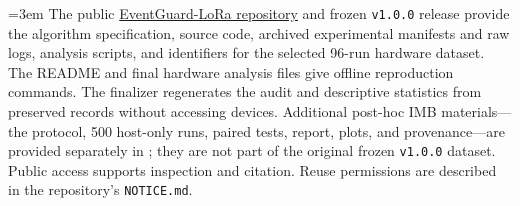 \documentclass[11pt]{article}
\begin{document}
\begingroup\emergencystretch=3em
The public \href{https://github.com/Sver0411/EventGuard-LoRa}{EventGuard-LoRa repository} and frozen \texttt{v1.0.0} release provide the algorithm specification, source code, archived experimental manifests and raw logs, analysis scripts, and identifiers for the selected 96-run hardware dataset. The README and final hardware analysis files give offline reproduction commands. The finalizer regenerates the audit and descriptive statistics from preserved records without accessing devices. Additional post-hoc IMB materials---the protocol, 500 host-only runs, paired tests, report, plots, and provenance---are provided separately in ; they are not part of the original frozen \texttt{v1.0.0} dataset. Public access supports inspection and citation. Reuse permissions are described in the repository's \texttt{NOTICE.md}.\par
\endgroup



\end{document}

